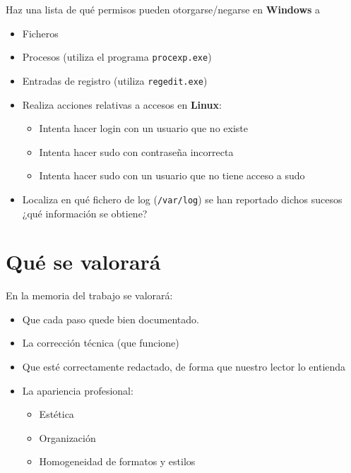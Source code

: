 \begin{homeworkProblem}

  Haz una lista de qué permisos pueden otorgarse/negarse en \textbf{Windows} a

  \begin{itemize}
  \item Ficheros
  \item Procesos (utiliza el programa \texttt{procexp.exe})
  \item Entradas de registro (utiliza \texttt{regedit.exe})
  \end{itemize}
\end{homeworkProblem}

\begin{homeworkProblem}
  \begin{itemize}
  \item Realiza acciones relativas a accesos en \textbf{Linux}:
    
    \begin{itemize}
    \item Intenta hacer login con un usuario que no existe
    \item Intenta hacer sudo con contraseña incorrecta
    \item Intenta hacer sudo con un usuario que no tiene acceso a sudo
    \end{itemize}
  \item Localiza en qué fichero de log (\texttt{/var/log}) se han reportado dichos sucesos ¿qué información se obtiene?
  \end{itemize}
\end{homeworkProblem}


\section{Qué se valorará}
En la memoria del trabajo se valorará:
\begin{itemize}
\item Que cada paso quede bien documentado. 
\item La corrección técnica (que funcione)
\item Que esté correctamente redactado, de forma que nuestro lector lo entienda 
\item La apariencia profesional:
  \begin{itemize}
  \item Estética
  \item Organización
  \item Homogeneidad de formatos y estilos
  \end{itemize}
\end{itemize}

